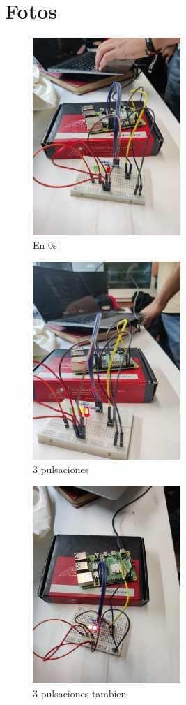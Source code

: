\documentclass[12pt]{report}
\begin{document}
\section{Fotos}
\begin{figure}[H]
  \centering
  \includegraphics[width=0.5\textwidth]{screenshots/foto1.jpeg}
  \caption{En 0s}
\end{figure}
\begin{figure}[H]
  \centering
  \includegraphics[width=0.5\textwidth]{screenshots/foto2.jpeg}
  \caption{3 pulsaciones}
\end{figure}
\begin{figure}[H]
  \centering
  \includegraphics[width=0.5\textwidth]{screenshots/foto3.jpeg}
  \caption{3 pulsaciones tambien}
\end{figure}
\end{document}
